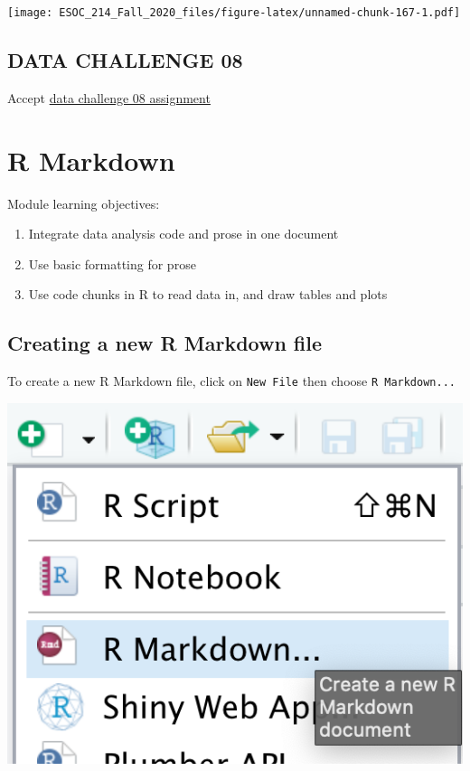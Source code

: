 \documentclass[
]{book}
\begin{document}
\texttt{[image: ESOC\_214\_Fall\_2020\_files/figure-latex/unnamed-chunk-167-1.pdf]}

\hypertarget{data-challenge-08}{%
\section{DATA CHALLENGE 08}\label{data-challenge-08}}

Accept \href{}{data challenge 08 assignment}

\hypertarget{r-markdown}{%
\chapter{R Markdown}\label{r-markdown}}

Module learning objectives:

\begin{enumerate}
\def\labelenumi{\arabic{enumi}.}
\item
  Integrate data analysis code and prose in one document
\item
  Use basic formatting for prose
\item
  Use code chunks in R to read data in, and draw tables and plots
\end{enumerate}

\hypertarget{creating-a-new-r-markdown-file}{%
\section{Creating a new R Markdown file}\label{creating-a-new-r-markdown-file}}

To create a new R Markdown file, click on \texttt{New\ File} then choose \texttt{R\ Markdown...}

\includegraphics[width=7.22in]{images/create_rmarkdown_file}
\end{document}
